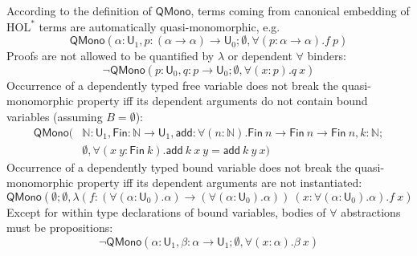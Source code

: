 According to the definition of $\mathsf{QMono}$, terms coming from canonical embedding of $\text{HOL}^*$
terms are automatically quasi-monomorphic, e.g.
$$\mathsf{QMono}(\alpha : \mathsf{U}_1, p : (\alpha \to \alpha) \to \mathsf{U}_0; \emptyset, \forall (p : \alpha \to \alpha). f \ p)$$
Proofs are not allowed to be quantified by $\lambda$ or dependent $\forall$ binders:
$$\neg \mathsf{QMono}(p : \mathsf{U}_0, q : p \to \mathsf{U}_0; \emptyset, \forall (x : p). q \ x)$$
Occurrence of a dependently typed free variable does not break the quasi-monomorphic property iff
its dependent arguments do not contain bound variables (assuming $B = \emptyset$):
\begin{align*}
  \mathsf{QMono}(
  & \mathbb{N} : \mathsf{U}_1, \mathsf{Fin} : \mathbb{N} \to \mathsf{U}_1,
    \mathsf{add} : \forall (n : \mathbb{N}). \mathsf{Fin} \ n \to \mathsf{Fin} \ n \to \mathsf{Fin} \ n, k : \mathbb{N}; \\
  & \emptyset, \forall (x \ y : \mathsf{Fin} \ k). \mathsf{add} \ k \ x \ y = \mathsf{add} \ k \ y \ x)
\end{align*}
Occurrence of a dependently typed bound variable does not break the quasi-monomorphic property iff
its dependent arguments are not instantiated:
$$\mathsf{QMono}(\emptyset; \emptyset, \lambda (f : (\forall (\alpha : \mathsf{U}_0). \alpha) \to (\forall (\alpha : \mathsf{U}_0). \alpha)) \
  (x : \forall (\alpha : \mathsf{U}_0). \alpha). f \ x)$$
Except for within type declarations of bound variables, bodies of $\forall$ abstractions must be propositions:
$$\neg \mathsf{QMono}(\alpha : \mathsf{U}_1, \beta : \alpha \to \mathsf{U}_1; \emptyset, \forall (x : \alpha). \beta \ x)$$

